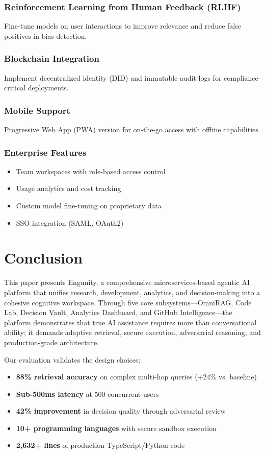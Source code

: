 \documentclass[conference]{IEEEtran}
\begin{document}
\subsubsection{Reinforcement Learning from Human Feedback (RLHF)}
Fine-tune models on user interactions to improve relevance and reduce false positives in bias detection.

\subsubsection{Blockchain Integration}
Implement decentralized identity (DID) and immutable audit logs for compliance-critical deployments.

\subsubsection{Mobile Support}
Progressive Web App (PWA) version for on-the-go access with offline capabilities.

\subsubsection{Enterprise Features}
\begin{itemize}
    \item Team workspaces with role-based access control
    \item Usage analytics and cost tracking
    \item Custom model fine-tuning on proprietary data
    \item SSO integration (SAML, OAuth2)
\end{itemize}


\section{Conclusion}

This paper presents Engunity, a comprehensive microservices-based agentic AI platform that unifies research, development, analytics, and decision-making into a cohesive cognitive workspace. Through five core subsystems—OmniRAG, Code Lab, Decision Vault, Analytics Dashboard, and GitHub Intelligence—the platform demonstrates that true AI assistance requires more than conversational ability; it demands adaptive retrieval, secure execution, adversarial reasoning, and production-grade architecture.

Our evaluation validates the design choices:
\begin{itemize}
    \item \textbf{88\% retrieval accuracy} on complex multi-hop queries (+24\% vs. baseline)
    \item \textbf{Sub-500ms latency} at 500 concurrent users
    \item \textbf{42\% improvement} in decision quality through adversarial review
    \item \textbf{10+ programming languages} with secure sandbox execution
    \item \textbf{2,632+ lines} of production TypeScript/Python code
\end{itemize}
\end{document}

